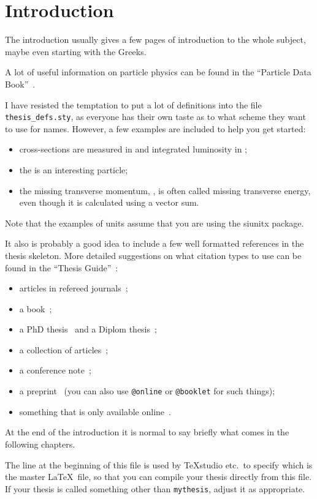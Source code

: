 
\chapter{Introduction}
\label{chap:intro}
The introduction usually gives a few pages of introduction to the
whole subject, maybe even starting with the Greeks.


A lot of useful information on particle physics can be found in the
\enquote{Particle Data Book}~\cite{pdg2010}.

I have resisted the temptation to put a lot of definitions into the
file \texttt{thesis\_defs.sty}, as everyone has their own taste as
to what scheme they want to use for names.
However, a few examples are included to help you get started:
\begin{itemize}
\setlength{\itemsep}{0pt}\setlength{\parskip}{0pt}
\item cross-sections are measured in \si{\pb} and integrated
  luminosity in \si{\invpb};
\item the \KoS is an interesting particle;
\item the missing transverse momentum, \pTmiss, is often called
  missing transverse energy, even though it is calculated using a vector sum.
\end{itemize}
Note that the examples of units assume that you are using the
\textsf{siunitx} package.

It also is probably a good idea to include a few well formatted
references in the thesis skeleton. More detailed suggestions on what
citation types to use can be found in the \enquote{Thesis Guide}~\cite{thesis-guide}:
\begin{itemize}
\item articles in refereed journals~\cite{pdg2010,Aad:2010ey};
\item a book~\cite{Halzen:1984mc};
\item a PhD thesis~\cite{tlodd:2012} and a Diplom thesis~\cite{mergelmeyer:2011};
\item a collection of articles~\cite{lhc:vol1};
\item a conference note~\cite{ATLAS-CONF-2011-008};
\item a preprint~\cite{atlas:perf:2009} (you can also use
  \texttt{@online} or \texttt{@booklet} for such things);
\item something that is only available online~\cite{thesis-guide}.
\end{itemize}

At the end of the introduction it is normal to say briefly what comes
in the following chapters.

The line at the beginning of this file is used by TeXstudio etc.\ to
specify which is the master \LaTeX\ file, so that you can compile your thesis
directly from this file.
If your thesis is called something other than \texttt{mythesis}, adjust it as appropriate.
